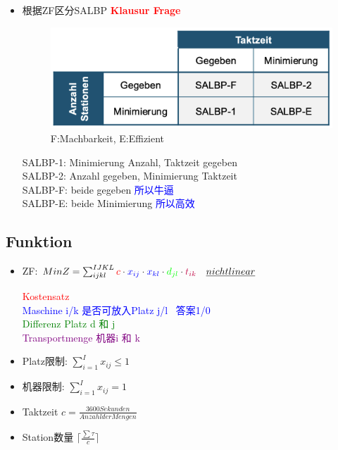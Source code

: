 \documentclass[12pt, letterpaper]{article}
\begin{document}
\begin{CJK*}{UTF8}{gbsn}
\begin{itemize}
\item 根据ZF区分SALBP \textbf{\textcolor{red}{Klausur Frage}}\\[1mm]
\begin{figure}[h!]
  \centering %
  \includegraphics[width=0.4\linewidth]{VL51.png}
  \caption*{F:Machbarkeit, E:Effizient} %
\end{figure}
 
SALBP-1: Minimierung Anzahl, Taktzeit gegeben\\[1mm]
SALBP-2: Anzahl gegeben, Minimierung Taktzeit\\[1mm]
SALBP-F: beide gegeben \textcolor{blue}{所以牛逼}\\[1mm]
SALBP-E: beide Minimierung \textcolor{blue}{所以高效}

\end{itemize}
\newpage


\subsection{Funktion}

\begin{itemize}

\item  ZF: $Min Z =   \sum_{ijkl}^{IJKL} 
\textcolor{red}{c} 
 \cdot \textcolor{blue}{x_{ij}}
 \cdot \textcolor{blue}{x_{kl}}
  \cdot \textcolor{green}{d_{jl}}
   \cdot \textcolor{purple}{t_{ik}}\ \  \   \underline{ nicht linear }$ 
   

\textcolor{red}{Kostensatz}\\
\textcolor{blue}{Maschine i/k 是否可放入Platz j/l \ 答案1/0}\\
\textcolor{green}{Differenz Platz d 和 j}\\
\textcolor{purple}{Transportmenge 机器i 和 k}
   
 \item Platz限制: $\sum_{i=1}^{I} x_{ij} \leq 1$
 \item 机器限制: $\sum_{i=1}^{I} x_{ij} = 1$\\[5mm]
 
 \item Taktzeit $c = \frac{3600 Sekunden}{Anzahl der Mengen}$
 
\item Station数量 $\lceil \frac{\sum \tau}{c} \rceil$


\end{itemize}
\end{CJK*}
\end{document}
